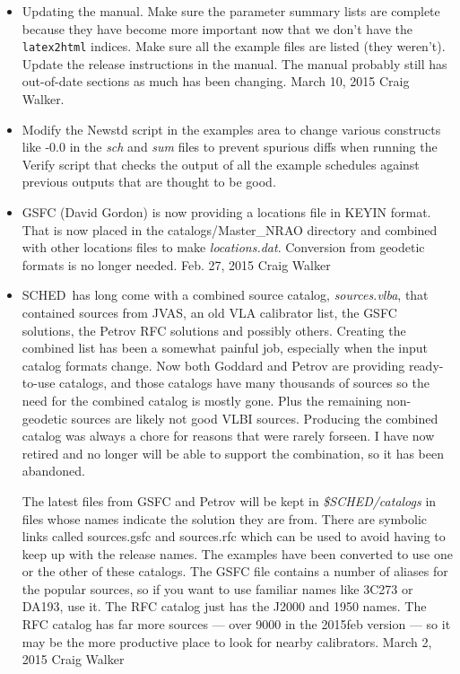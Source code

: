 \documentclass{report}
\newcommand{\schedb}{{\sc SCHED~}}
\begin{document}
\begin{itemize}

\item Updating the manual.  Make sure the parameter summary lists are
complete because they have become more important now that we don't
have the {\tt latex2html} indices.  Make sure all the example files are
listed (they weren't). Update the release instructions
in the manual.  The manual probably still has out-of-date sections as
much has been changing.  March 10, 2015  Craig Walker.

\item Modify the Newstd script in the examples area to change various constructs
like -0.0 in the {\sl sch} and {\sl sum} files to prevent spurious diffs when
running the Verify script that checks the output of all the example schedules
against previous outputs that are thought to be good.

\item GSFC (David Gordon) is now providing a locations file in 
KEYIN format.  That is now placed in the catalogs/Master\_NRAO directory
and combined with other locations files to make {\sl locations.dat}.
Conversion from geodetic formats is no longer needed.  Feb. 27, 2015  Craig
Walker

\item \schedb has long come with a combined source catalog, {\sl
sources.vlba}, that contained sources from JVAS, an old VLA calibrator
list, the GSFC solutions, the Petrov RFC solutions and possibly
others.  Creating the combined list has been a somewhat painful job,
especially when the input catalog formats change.  Now both
Goddard and Petrov are providing ready-to-use catalogs, and those
catalogs have many thousands of sources so the need for the combined
catalog is mostly gone.  Plus the remaining non-geodetic sources 
are likely not good VLBI sources.  Producing the combined 
catalog was always a chore for reasons that were rarely forseen.  
I have now retired and no longer will be able to support the combination,
so it has been abandoned.

The latest files from GSFC and Petrov will be kept in {\sl
\$SCHED/catalogs} in files whose names indicate the solution they are
from.  There are symbolic links called sources.gsfc and sources.rfc
which can be used to avoid having to keep up with the release names.
The examples have been converted to use one or the other of these
catalogs.  The GSFC file contains a number of aliases for the popular
sources, so if you want to use familiar names like 3C273 or DA193, use it.  
The RFC catalog just has the J2000 and 1950 names.  The RFC
catalog has far more sources --- over 9000 in the 2015feb version --- so
it may be the more productive place to look for nearby calibrators.
March 2, 2015 Craig Walker


\end{itemize}
\end{document}
